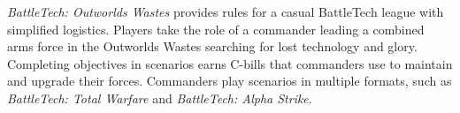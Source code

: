 \emph{BattleTech: Outworlds Wastes} provides rules for a casual BattleTech league with simplified logistics.
Players take the role of a commander leading a combined arms force in the Outworlds Wastes searching for lost technology and glory.
Completing objectives in scenarios earns C-bills that commanders use to maintain and upgrade their forces.
Commanders play scenarios in multiple formats, such as \emph{BattleTech: Total Warfare} and \emph{BattleTech: Alpha Strike}.
